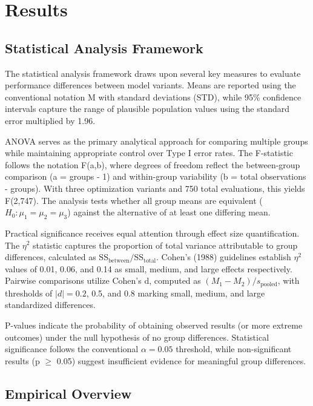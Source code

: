 \chapter{Results}
\label{sec:results}

\section{Statistical Analysis Framework}
\label{sec:statistical-framework}

The statistical analysis framework draws upon several key measures to evaluate performance differences between model variants. Means are reported using the conventional notation M with standard deviations (STD), while 95\% confidence intervals capture the range of plausible population values using the standard error multiplied by 1.96.

ANOVA serves as the primary analytical approach for comparing multiple groups while maintaining appropriate control over Type I error rates. The F-statistic follows the notation F(a,b), where degrees of freedom reflect the between-group comparison (a = groups - 1) and within-group variability (b = total observations - groups). With three optimization variants and 750 total evaluations, this yields F(2,747). The analysis tests whether all group means are equivalent ($H_0: \mu_1 = \mu_2 = \mu_3$) against the alternative of at least one differing mean.

Practical significance receives equal attention through effect size quantification. The $\eta^2$ statistic captures the proportion of total variance attributable to group differences, calculated as $\text{SS}_{\text{between}}/\text{SS}_{\text{total}}$. Cohen's (1988) guidelines establish $\eta^2$ values of 0.01, 0.06, and 0.14 as small, medium, and large effects respectively. Pairwise comparisons utilize Cohen's d, computed as $(M_1 - M_2)/s_{\text{pooled}}$, with thresholds of $|d| = 0.2$, 0.5, and 0.8 marking small, medium, and large standardized differences.

P-values indicate the probability of obtaining observed results (or more extreme outcomes) under the null hypothesis of no group differences. Statistical significance follows the conventional $\alpha = 0.05$ threshold, while non-significant results (p $\geq$ 0.05) suggest insufficient evidence for meaningful group differences.

\section{Empirical Overview}
\label{sec:empirical-overview}

